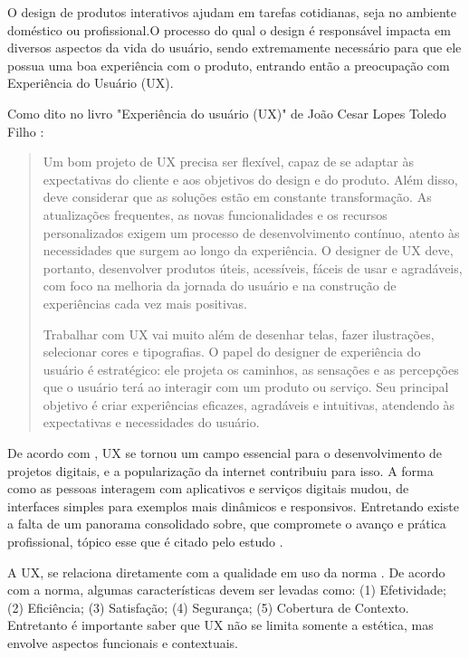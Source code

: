 O design de produtos interativos ajudam em tarefas cotidianas, seja no ambiente doméstico ou profissional.O processo do qual o design é responsável impacta em diversos aspectos da vida do usuário, sendo extremamente necessário para que ele possua uma boa experiência com o produto, entrando então a preocupação com Experiência do Usuário (UX).

Como dito no livro "Experiência do usuário (UX)" de João Cesar Lopes Toledo Filho \citep{toledoFilho2020}:

\begin{quote}
Um bom projeto de UX precisa ser flexível, capaz de se adaptar às expectativas do cliente e aos objetivos do design e do produto. Além disso, deve considerar que as soluções estão em constante transformação. As atualizações frequentes, as novas funcionalidades e os recursos personalizados exigem um processo de desenvolvimento contínuo, atento às necessidades que surgem ao longo da experiência. O designer de UX deve, portanto, desenvolver produtos úteis, acessíveis, fáceis de usar e agradáveis, com foco na melhoria da jornada do usuário e na construção de experiências cada vez mais positivas.

Trabalhar com UX vai muito além de desenhar telas, fazer ilustrações, selecionar cores e tipografias. O papel do designer de experiência do usuário é estratégico: ele projeta os caminhos, as sensações e as percepções que o usuário terá ao interagir com um produto ou serviço. Seu principal objetivo é criar experiências eficazes, agradáveis e intuitivas, atendendo às expectativas e necessidades do usuário.
\end{quote}

De acordo com \citep{stati_sarmento_2021}, UX se tornou um campo essencial para o desenvolvimento de projetos digitais, e a popularização da internet contribuiu para isso. A forma como as pessoas interagem com aplicativos e serviços digitais mudou, de interfaces simples para exemplos mais dinâmicos e responsivos. Entretando existe a falta de um panorama consolidado sobre, que compromete o avanço e prática profissional, tópico esse que é citado pelo estudo \citep{wbots}.

A UX, se relaciona diretamente com a qualidade em uso da norma \citep{iso25010_2011}. De acordo com a norma, algumas características devem ser levadas como: (1) Efetividade; (2) Eficiência; (3) Satisfação; (4) Segurança; (5) Cobertura de Contexto. Entretanto é importante saber que UX não se limita somente a estética, mas envolve aspectos funcionais e contextuais.

